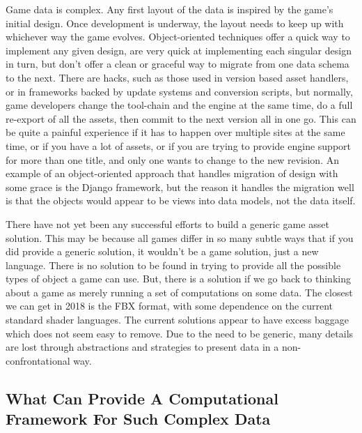 \documentclass[a4paper,12pt]{book}
\begin{document}
Game data is complex.
Any first layout of the data is inspired by the game's initial design.
Once development is underway, the layout needs to keep up with whichever way the game evolves.
Object-oriented techniques offer a quick way to implement any given design, are very quick at implementing each singular design in turn, but don't offer a clean or graceful way to migrate from one data schema to the next.
There are hacks, such as those used in version based asset handlers, or in frameworks backed by update systems and conversion scripts, but normally, game developers change the tool-chain and the engine at the same time, do a full re-export of all the assets, then commit to the next version all in one go.
This can be quite a painful experience if it has to happen over multiple sites at the same time, or if you have a lot of assets, or if you are trying to provide engine support for more than one title, and only one wants to change to the new revision.
An example of an object-oriented approach that handles migration of design with some grace is the Django framework, but the reason it handles the migration well is that the objects would appear to be views into data models, not the data itself.

There have not yet been any successful efforts to build a generic game asset solution.
This may be because all games differ in so many subtle ways that if you did provide a generic solution, it wouldn't be a game solution, just a new language.
There is no solution to be found in trying to provide all the possible types of object a game can use.
But, there is a solution if we go back to thinking about a game as merely running a set of computations on some data.
The closest we can get in 2018 is the FBX format, with some dependence on the current standard shader languages.
The current solutions appear to have excess baggage which does not seem easy to remove.
Due to the need to be generic, many details are lost through abstractions and strategies to present data in a non-confrontational way.

\subsection{What Can Provide A Computational Framework For Such Complex Data}
\end{document}
